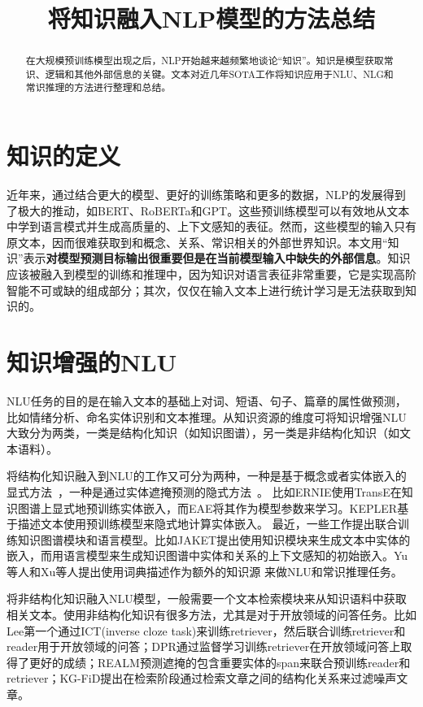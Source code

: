 \documentclass[12pt]{article}
\begin{document}
\title{将知识融入NLP模型的方法总结}
\maketitle

\begin{abstract}
在大规模预训练模型出现之后，NLP开始越来越频繁地谈论“知识”。知识是模型获取常识、逻辑和其他外部信息的关键。文本对近几年SOTA工作将知识应用于NLU、NLG和常识推理的方法进行整理和总结。
\end{abstract}

\section{知识的定义}
近年来，通过结合更大的模型、更好的训练策略和更多的数据，NLP的发展得到了极大的推动，如BERT、RoBERTa和GPT。这些预训练模型可以有效地从文本中学到语言模式并生成高质量的、上下文感知的表征。然而，这些模型的输入只有原文本，因而很难获取到和概念、关系、常识相关的外部世界知识。本文用“知识”表示\textbf{对模型预测目标输出很重要但是在当前模型输入中缺失的外部信息}。知识应该被融入到模型的训练和推理中，因为知识对语言表征非常重要，它是实现高阶智能不可或缺的组成部分；其次，仅仅在输入文本上进行统计学习是无法获取到知识的。

\section{知识增强的NLU}
NLU任务的目的是在输入文本的基础上对词、短语、句子、篇章的属性做预测，比如情绪分析、命名实体识别和文本推理。从知识资源的维度可将知识增强NLU大致分为两类，一类是结构化知识（如知识图谱），另一类是非结构化知识（如文本语料）。

将结构化知识融入到NLU的工作又可分为两种，一种是基于概念或者实体嵌入的显式方法~\cite{zhang2019ernie,peters2019knowledge,liu2020k,yu2020identifying,zeng2020tri}，一种是通过实体遮掩预测的隐式方法~\cite{sun2019ernie,shen2020exploiting,xiong2020pretrained,wang2021kepler}。
比如ERNIE\cite{zhang2019ernie}使用TransE在知识图谱上显式地预训练实体嵌入，而EAE\cite{fevry2020entities}将其作为模型参数来学习。KEPLER\cite{wang2021kepler}基于描述文本使用预训练模型来隐式地计算实体嵌入。
最近，一些工作提出联合训练知识图谱模块和语言模型。比如JAKET\cite{yu2022jaket}提出使用知识模块来生成文本中实体的嵌入，而用语言模型来生成知识图谱中实体和关系的上下文感知的初始嵌入。Yu等人\cite{yu2022dict}和Xu等人\cite{xu2021fusing}提出使用词典描述作为额外的知识源 来做NLU和常识推理任务。

将非结构化知识融入NLU模型，一般需要一个文本检索模块来从知识语料中获取相关文本。使用非结构化知识有很多方法，尤其是对于开放领域的问答任务。比如Lee第一个通过ICT(inverse cloze task)来训练retriever，然后联合训练retriever和reader用于开放领域的问答；DPR通过监督学习训练retriever在开放领域问答上取得了更好的成绩；REALM预测遮掩的包含重要实体的span来联合预训练reader和retriever；KG-FiD提出在检索阶段通过检索文章之间的结构化关系来过滤噪声文章。
\end{document}
